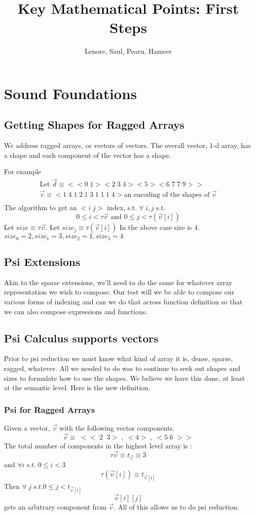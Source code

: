 \documentclass[11pt]{article} %
\title{Key Mathematical Points: First Steps}
\author{Lenore, Saul, Pearu, Hameer}
\begin{document}
\maketitle

\section{Sound  Foundations}
\subsection{Getting Shapes for Ragged Arrays}
We address ragged arrays, or vectors of vectors. The overall vector, 1-d array, has a shape and each component of the vector has a shape. 

For example
\begin{eqnarray}
\mbox{Let }
\vec d \equiv <<0\;1> <2\;3\;4> <5> <6\;7\;7\;9>>\\
\vec v \equiv <1\; 4\; 1\; 2\; 1\; 3\; 1\; 1 \;1\; 4>
\mbox{an encoding of the shapes of } \vec v\\
\end{eqnarray}
The algorithm to get an $<i\;j>$ index, s.t. $\forall \;i,j$ s.t.
\[ 0 \leq i < \tau \vec v \mbox{ and } 0 \leq j < \tau (\vec v[i])\]
Let $size \equiv \tau \vec v$. Let ${size}_j \equiv \tau (\vec v[i])$
In the above case size is $4$.
${size}_0 =2, {size}_1 = 3, {size}_2 = 1, {size}_3 = 4$
\subsection{Psi Extensions}
Akin to the sparse extensions, we'll need to do the same for whatever array representation we wish to compose. Our test will we be able to compose our various forms of indexing and
can we do that across function definition so that we can also compose expressions and functions.
\subsection{Psi Calculus supports vectors}
Prior to psi reduction we must know what kind of array it is, dense, sparse, ragged, whatever. All we needed to do was to continue to seek out shapes and sizes to formulate how to use the shapes. We believe we have this done, at least at the semantic level. Here is the new definition.
\subsubsection{Psi for Ragged Arrays}
Given a vector, $\vec v$ with the following vector components.
\[ \vec v \equiv\; << \; 2\;\; 3 > \;,\; <4>\;,\;< 5 \;6\;>>\]
The total number of components in the highest level array is : 
\[ \tau \vec v \equiv t_{\vec v} \equiv 3 \]
and $\forall i \; s.t. \; 0 \leq i < 3$
\[ \tau (\vec v [i]) \equiv t_{\vec v[i]}\]
Then $\forall \; j\; s.t. 0 \leq j < t_{\vec v[i]}$
\[ \vec v[i][j] \]
gets an arbitrary component from $\vec v$.
All of this allows us to do psi reduction. 
\end{document}

